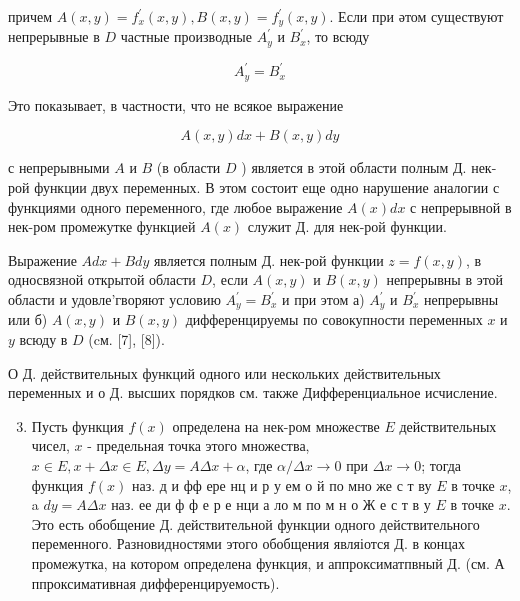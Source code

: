 \documentclass[10pt]{article}
\begin{document}
причем $A(x, y)=f_{x}^{\prime}(x, y), B(x, y)=f_{y}^{\prime}(x, y)$. Если при әтом существуют непрерывные в $D$ частные производные $A_{y}^{\prime}$ и $B_{x}^{\prime}$, то всюду



\[

A_{y}^{\prime}=B_{x}^{\prime}

\]



Это показывает, в частности, что не всякое выражение



\[

A(x, y) d x+B(x, y) d y

\]



с непрерывными $A$ и $B$ (в области $D$ ) является в этой области полным Д. нек-рой функции двух переменных. В этом состоит еще одно нарушение аналогии с функциями одного переменного, где любое выражение $A(x) d x$ с непрерывной в нек-ром промежутке функцией $A(x)$ служит Д. для нек-рой функции.



Выражение $A d x+B d y$ является полным Д. нек-рой функции $z=f(x, y)$, в односвязной открытой области $D$, если $A(x, y)$ и $B(x, y)$ непрерывны в этой области и удовле'гворяют условию $A_{y}^{\prime}=B_{x}^{\prime}$ и при этом а) $A_{y}^{\prime}$ и $B_{x}^{\prime}$ непрерывны или б) $A(x, y)$ и $B(x, y)$ дифференцируемы по совокупности переменных $x$ и $y$ всюду в $D$ (cм. [7], [8]).



О Д. действительных функций одного или нескольких действительных переменных и о Д. высших порядков см. также Дифференциальное исчисление.



\begin{enumerate}

  \setcounter{enumi}{2}

  \item Пусть функция $f(x)$ определена на нек-ром множестве $E$ действительных чисел, $x$ - предельная точка этого множества, $x \in E, x+\Delta x \in E, \Delta y=A \Delta x+\alpha$, где $\alpha / \Delta x \rightarrow 0$ при $\Delta x \rightarrow 0$; тогда функция $f(x)$ наз. д и фф ере нц и р у ем о й по мно же с т ву $E$ в точке $x$, a $d y=A \Delta x$ наз. ее ди ф ф е р е нци а ло м по м н о Ж е с т в у $E$ в точке $x$. Это есть обобщение Д. действительной функции одного действительного переменного. Разновидностями этого обобщения являіотся Д. в концах промежутка, на котором определена функция, и аппроксиматпвный Д. (см. А ппроксимативная дифференцируемость).

\end{enumerate}
\end{document}
